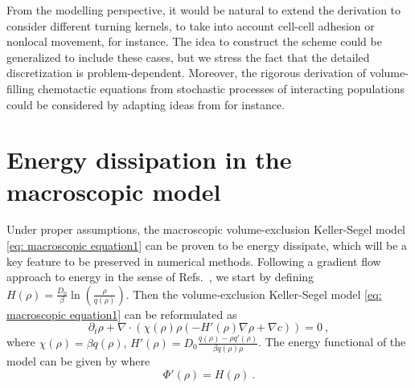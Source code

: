 \documentclass[review,onefignum,onetabnum]{siamart220329}
\newcommand*\diff{\mathop{}\!\mathrm{d}}
\begin{document}
{From the modelling perspective, it would be natural to extend the derivation to consider different turning kernels, to take into account cell-cell adhesion or nonlocal movement, for instance. The idea to construct the scheme could be generalized to include these cases, but we stress the fact that the detailed discretization is problem-dependent. %
Moreover, the rigorous derivation of volume-filling chemotactic equations from stochastic processes of interacting populations could be considered by adapting ideas from \cite{stevens2000derivation} for instance. 
}


\appendix
\section{Energy dissipation in the macroscopic model} \label{subsec:energy}
{Under proper assumptions, the macroscopic volume-exclusion Keller-Segel model \cref{eq: macroscopic equation1} can be proven to be energy dissipate, which will be a key feature to be preserved in numerical methods. 
Following a gradient flow approach to energy in the sense of Refs.~\cite{calvez2006volume,carrillo2001entropy,de2018energy}, we start by defining $H(\rho) = \frac{D_0}{\beta}\ln\left(\frac{\rho}{q(\rho)}\right)$. }%
Then the volume-exclusion Keller-Segel model \cref{eq: macroscopic equation1} can be reformulated as 
\begin{equation}
    \partial_t\rho+\nabla\cdot(\chi(\rho)\rho(-H'(\rho)\nabla\rho+\nabla c))= 0\ , \label{eq: new version of macro}
\end{equation}
where $\chi(\rho)=\beta q(\rho), \, H'(\rho)=D_0\frac{q(\rho)-\rho q'(\rho)}{\beta q(\rho)\rho}$.
The energy functional of the model can be given by {\color{red}{
\begin{equation}\label{def:energy_macro}
    \mathcal{E}(t)=\int\Phi(\rho)\diff \mathbf{x}-\frac{1}{2}\int\rho c\diff \mathbf{x}\ ,
\end{equation}
}}
where 
\begin{equation}\label{functionPhi}
    \Phi'(\rho)=H(\rho)\ .
\end{equation}
\end{document}
